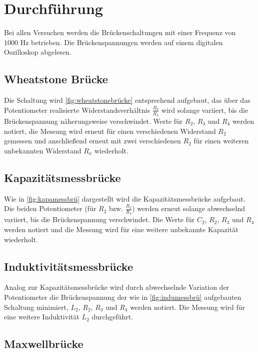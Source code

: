 \section{Durchführung}
\label{sec:Durchführung}

Bei allen Versuchen werden die Brückenschaltungen mit einer Frequenz von $1000 \, \, \unit{\hertz}$ betrieben.
Die Brückenspannungen werden auf einem digitalen Oszilloskop abgelesen.

\subsection{Wheatstone Brücke}

Die Schaltung wird \autoref{fig:wheatstonebrücke} entsprechend aufgebaut, das über das Potentiometer
realisierte Widerstandsverhältnis $\frac{R_3}{R_4}$ wird solange variiert, bis die Brückenspannung 
näherungsweise verschwindet.
Werte für $R_2$, $R_3$ und $R_4$ werden notiert, die Messung wird erneut für einen verschiedenen 
Widerstand $R_2$ gemessen und anschließend erneut mit zwei verschiedenen $R_2$ für einen weiteren 
unbekannten Widerstand $R_x$ wiederholt.


\subsection{Kapazitätsmessbrücke}

Wie in \autoref{fig:kapamessbrü} dargestellt wird die Kapazitätsmessbrücke aufgebaut.
Die beiden Potentiometer (für $R_2$ bzw. $\frac{R_3}{R_4}$) werden erneut solange abwechselnd variiert, 
bis die Brückenspannung verschwindet. Die Werte für $C_2$, $R_2$, $R_3$ und $R_4$ werden notiert und die Messung
wird für eine weitere unbekannte Kapazität wiederholt.


\subsection{Induktivitätsmessbrücke}
\label{subsec:indumessdurch}

Analog zur Kapazitätsmessbrücke wird durch abwechselnde Variation der Potentiometer die Brückenspannung
der wie in \autoref{fig:indumessbrü} aufgebauten Schaltung minimiert, $L_2$, $R_2$, $R_3$ und $R_4$ 
werden notiert.
Die Messung wird für eine weitere Induktivität $L_2$ durchgeführt.


\subsection{Maxwellbrücke}

